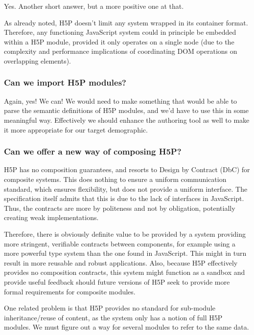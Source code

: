 Yes. Another short answer, but a more positive one at that.

As already noted, H5P doesn't limit any system wrapped in its container
format. Therefore, any functioning JavaScript system could in principle be
embedded within a H5P module, provided it only operates on a single node (due 
to the complexity and performance implications of coordinating DOM operations 
on overlapping elements).

\subsubsection{Can we import H5P modules?}

Again, yes! We can! We would need to make something that would be able to 
parse the semantic definitions of H5P modules, and we'd have to use this in 
some meaningful way. Effectively we should enhance the authoring tool as well 
to make it more appropriate for our target demographic.

\subsubsection{Can we offer a new way of composing H5P?}

H5P has no composition guarantees, and resorts to Design by Contract (DbC) for
composite systems.\cite{h5pdbc} This does nothing to ensure a uniform
communication standard, which ensures flexibility, but does not provide a
uniform interface. The specification itself admits that this is due to the lack
of interfaces in JavaScript. Thus, the contracts are more by politeness and not
by obligation, potentially creating weak implementations.

Therefore, there is obviously definite value to be provided by a system
providing more stringent, verifiable contracts between components, for example
using a more powerful type system than the one found in JavaScript. This might
in turn result in more reusable and robust applications. Also, because H5P 
effectively provides no composition contracts, this system might function as a 
sandbox and provide useful feedback should future versions of H5P seek to 
provide more formal requirements for composite modules.

One related problem is that H5P provides no standard for sub-module 
inheritance/reuse of content, as the system only has a notion of full H5P 
modules. We must figure out a way for several modules to refer to the same 
data.
